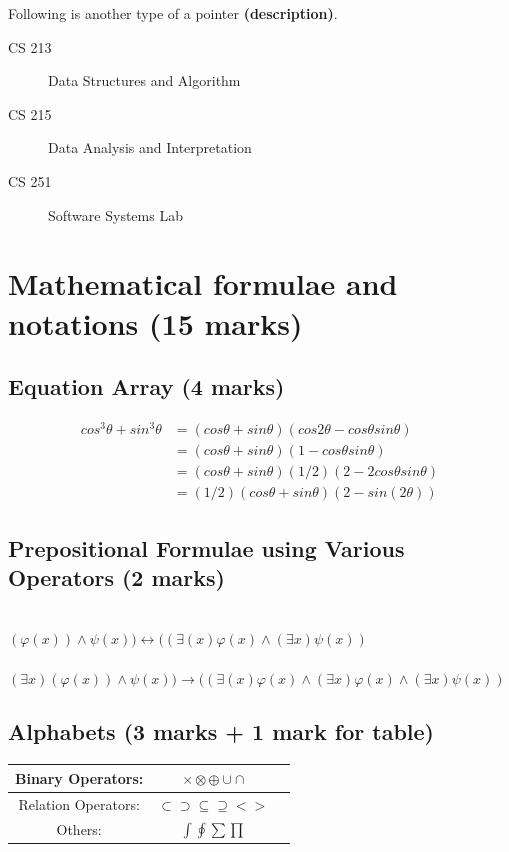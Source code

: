 \documentclass[english,12pt]{article}
\begin{document}
Following is another type of a pointer \textbf{(description)}.
\begin{description}
	\item[CS 213] Data Structures and Algorithm
	\item[CS 215] Data Analysis and Interpretation
	\item[CS 251] Software Systems Lab
\end{description}
\newpage
\section{Mathematical formulae and notations (15 marks)}
\subsection{Equation Array (4 marks)}
\begin{align}
cos^3\theta+sin^3\theta &=(cos\theta+sin\theta)(cos2\theta-cos\theta sin\theta)\label{eq1}\\
						&=(cos\theta+sin\theta)(1-cos\theta sin\theta)\\
						&=(cos\theta+sin\theta)(1/2)(2-2cos\theta sin\theta)\\
						&=(1/2)(cos\theta+sin\theta)(2-sin(2\theta))
\end{align}
\subsection{Prepositional Formulae using Various Operators (2 marks)}
\mbox{}\\
$\displaystyle(\varphi(x))\wedge\psi(x))\longleftrightarrow((\exists(x)\varphi(x)\wedge(\exists x)\psi(x))$\\
\\
$\displaystyle(\exists x)(\varphi(x))\wedge\psi(x))\longrightarrow((\exists(x)\varphi(x)\wedge(\exists x)\varphi(x)\wedge(\exists x)\psi(x))$
\subsection{Alphabets (3 marks + 1 mark for table)}
\vspace*{5mm}
\begin{center}
\begin{tabular}{ |c|c|c| } 
 \hline
 Binary Operators: & $\times\otimes\oplus\cup\cap$ \\[2ex] 
 \hline
 Relation Operators: & $\subset\supset\subseteq\supseteq<>$ \\[2ex] 
 \hline
 Others: & $\int\oint\sum\prod$ \\[2ex]
 \hline
\end{tabular}
\end{center}
\vspace*{1mm}
\end{document}
